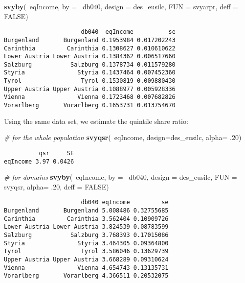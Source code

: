 \documentclass[]{book}
\newenvironment{Shaded}{\begin{snugshade}}{\end{snugshade}}
\newcommand{\KeywordTok}[1]{\textcolor[rgb]{0.13,0.29,0.53}{\textbf{{#1}}}}
\newcommand{\DataTypeTok}[1]{\textcolor[rgb]{0.13,0.29,0.53}{{#1}}}
\newcommand{\DecValTok}[1]{\textcolor[rgb]{0.00,0.00,0.81}{{#1}}}
\newcommand{\CommentTok}[1]{\textcolor[rgb]{0.56,0.35,0.01}{\textit{{#1}}}}
\newcommand{\OtherTok}[1]{\textcolor[rgb]{0.56,0.35,0.01}{{#1}}}
\newcommand{\NormalTok}[1]{{#1}}
\begin{document}
\begin{Shaded}
\begin{Highlighting}[]
\KeywordTok{svyby}\NormalTok{(~eqIncome, }\DataTypeTok{by =} \NormalTok{~db040, }\DataTypeTok{design =} \NormalTok{des_eusilc, }\DataTypeTok{FUN =} \NormalTok{svyarpr, }\DataTypeTok{deff =} \OtherTok{FALSE}\NormalTok{)}
\end{Highlighting}
\end{Shaded}

\begin{verbatim}
                      db040  eqIncome          se
Burgenland       Burgenland 0.1953984 0.017202243
Carinthia         Carinthia 0.1308627 0.010610622
Lower Austria Lower Austria 0.1384362 0.006517660
Salzburg           Salzburg 0.1378734 0.011579280
Styria               Styria 0.1437464 0.007452360
Tyrol                 Tyrol 0.1530819 0.009880430
Upper Austria Upper Austria 0.1088977 0.005928336
Vienna               Vienna 0.1723468 0.007682826
Vorarlberg       Vorarlberg 0.1653731 0.013754670
\end{verbatim}

Using the same data set, we estimate the quintile share ratio:

\begin{Shaded}
\begin{Highlighting}[]
\CommentTok{# for the whole population}
\KeywordTok{svyqsr}\NormalTok{(~eqIncome, }\DataTypeTok{design=}\NormalTok{des_eusilc, }\DataTypeTok{alpha=} \NormalTok{.}\DecValTok{20}\NormalTok{)}
\end{Highlighting}
\end{Shaded}

\begin{verbatim}
          qsr     SE
eqIncome 3.97 0.0426
\end{verbatim}

\begin{Shaded}
\begin{Highlighting}[]
\CommentTok{# for domains}
\KeywordTok{svyby}\NormalTok{(~eqIncome, }\DataTypeTok{by =} \NormalTok{~db040, }\DataTypeTok{design =} \NormalTok{des_eusilc,}
  \DataTypeTok{FUN =} \NormalTok{svyqsr, }\DataTypeTok{alpha=} \NormalTok{.}\DecValTok{20}\NormalTok{, }\DataTypeTok{deff =} \OtherTok{FALSE}\NormalTok{)}
\end{Highlighting}
\end{Shaded}

\begin{verbatim}
                      db040 eqIncome         se
Burgenland       Burgenland 5.008486 0.32755685
Carinthia         Carinthia 3.562404 0.10909726
Lower Austria Lower Austria 3.824539 0.08783599
Salzburg           Salzburg 3.768393 0.17015086
Styria               Styria 3.464305 0.09364800
Tyrol                 Tyrol 3.586046 0.13629739
Upper Austria Upper Austria 3.668289 0.09310624
Vienna               Vienna 4.654743 0.13135731
Vorarlberg       Vorarlberg 4.366511 0.20532075
\end{verbatim}
\end{document}
